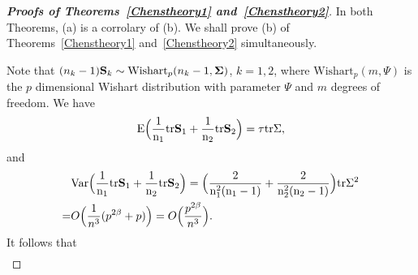 \documentclass[times,sort&compress,3p]{elsarticle}
\newcommand{\mytr}{\rm tr}
\newcommand{\myE}{\rm E}
\newcommand{\myVar}{\rm Var}
\theoremstyle{plain}
\theoremstyle{definition}
\theoremstyle{remark}
\begin{document}
\begin{appendices}
\begin{proof}[\textbf{Proofs of Theorems~\ref{Chenstheory1} and~\ref{Chenstheory2}}]
    In both Theorems, (a) is a corrolary of (b).
    We shall prove (b) of Theorems~\ref{Chenstheory1} and~\ref{Chenstheory2} simultaneously.
    
    Note that $(n_k-1)\BS_k\sim \text{Wishart}_p(n_k-1,\bSigma)$, $k=1,2$,
    where $\text{Wishart}_p(m,\Psi)$ is the $p$ dimensional Wishart distribution with parameter $\Psi$ and $m$ degrees of freedom.
    We have %
%
    $$
 \myE\Big(\frac{1}{n_1}\mytr \BS_1+\frac{1}{n_2}\mytr \BS_2\Big)=\tau \mytr\bSigma,
    $$
    and
    $$
    \begin{aligned}
        &\myVar\Big(\frac{1}{n_1}\mytr \BS_1+\frac{1}{n_2}\mytr \BS_2\Big)=
        \Big(\frac{2}{n_1^2(n_1-1)}+\frac{2}{n_2^2(n_2-1)}\Big)\mytr \bSigma^2\\
        =&
    O\Big(\frac{1}{n^3}(p^{2\beta}+p)\Big)=O\Big(\frac{p^{2\beta}}{n^3}\Big).
    \end{aligned}
    $$
    It follows that
    $$
    \begin{aligned}

\end{aligned}$$
\end{proof}
\end{appendices}
\end{document}
